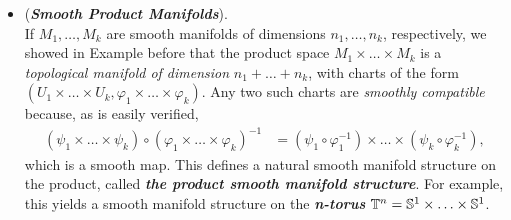 \documentclass[11pt]{article}
\begin{document}
\begin{itemize}
\item \begin{example} (\emph{\textbf{Smooth Product Manifolds}}).\\
If $M_1 ,\ldots, M_k$ are smooth manifolds of dimensions $n_1,\ldots,n_k$, respectively, we showed in Example before that the product space $M_1 \times \ldots \times M_k$ is a \emph{topological manifold of dimension} $n_1 + \ldots + n_k$, with charts of the form $(U_1 \times \ldots \times U_k, \varphi_1\times \ldots \times \varphi_{k})$. Any two such charts are \emph{smoothly compatible} because, as is easily verified,
\begin{align*}
(\psi_1 \times \ldots \times \psi_{k}) \circ (\varphi_1\times \ldots \times \varphi_{k})^{-1} &= (\psi_1 \circ \varphi_1^{-1}) \times \ldots \times (\psi_k \circ \varphi_k^{-1}),
\end{align*}
which is a smooth map. This defines a natural smooth manifold structure on the product, called \emph{\textbf{the product smooth manifold structure}}. For example, this yields a smooth manifold structure on the \emph{\textbf{n-torus}} $\mathbb{T}^n = {\mathbb S}^1 \times \ldots \times {\mathbb S}^1$.
\end{example}


\end{itemize}
\end{document}
